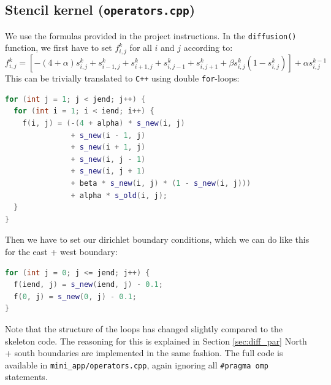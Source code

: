 \documentclass[unicode,10pt,a4paper,oneside,numbers=endperiod,openany]{scrartcl}
\begin{document}
\subsection{Stencil kernel (\texttt{operators.cpp})} We use the formulas provided in the project instructions. In the \texttt{diffusion()} function, we first have to set \(f_{i,j}^{k}\) for all \(i\) and \(j\) according to: \[f_{i,j}^{k} = \left\lbrack - (4 + \alpha)s_{i,j}^{k} + s_{i - 1,j}^{k} + s_{i + 1,j}^{k} + s_{i,j - 1}^{k} + s_{i,j + 1}^{k} + \beta s_{i,j}^{k}\left( 1 - s_{i,j}^{k} \right) \right\rbrack + \alpha s_{i,j}^{k - 1}\] This can be trivially translated to \texttt{C++} using double \texttt{for}-loops: \begin{lstlisting}[language=C++]
for (int j = 1; j < jend; j++) {
  for (int i = 1; i < iend; i++) {
    f(i, j) = (-(4 + alpha) * s_new(i, j)
               + s_new(i - 1, j)
               + s_new(i + 1, j)
               + s_new(i, j - 1)
               + s_new(i, j + 1)
               + beta * s_new(i, j) * (1 - s_new(i, j)))
               + alpha * s_old(i, j);
  }
}
\end{lstlisting}
 Then we have to set our dirichlet boundary conditions, which we can do like this for the east + west boundary: \begin{lstlisting}[language=C++]
for (int j = 0; j <= jend; j++) {
  f(iend, j) = s_new(iend, j) - 0.1;
  f(0, j) = s_new(0, j) - 0.1;
}
\end{lstlisting}
 Note that the structure of the loops has changed slightly compared to the skeleton code. The reasoning for this is explained in Section \ref{sec:diff_par} North + south boundaries are implemented in the same fashion. The full code is available in \texttt{mini\_app/operators.cpp}, again ignoring all \texttt{\#pragma omp} statements.
\end{document}
